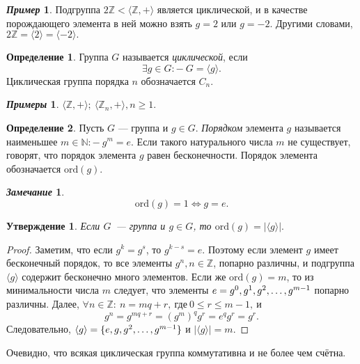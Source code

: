 \documentclass[a4paper, 14pt]{extarticle}
\newcommand{\integers}{\mathbb{Z}}
\newcommand{\naturals}{\mathbb{N}}
\newcommand{\ord}{\mathrm{ord}}
\newcommand{\suchthat}{{:}{-} \ }
\theoremstyle{definition}
\newtheorem*{exmpl*}{\textit{Пример}}
\newtheorem*{exmpls}{\textit{Примеры}}
\newtheorem*{remark}{\textit{Замечание}}
\newtheorem{definition}{Определение}
\theoremstyle{plain}
\numberwithin{theorem}{section}
\numberwithin{definition}{section}
\newtheorem*{statement*}{Утверждение}
\numberwithin{statement}{section}
\numberwithin{lemma}{section}
\numberwithin{consequence}{section}
\begin{document}
	\begin{exmpl*}
		Подгруппа ${2\integers < \langle \integers, + \rangle}$ является циклической, и в качестве порождающего элемента в ней можно взять $g = 2$ или $g = -2.$ Другими словами, ${2\integers = \langle 2 \rangle = \langle -2 \rangle.}$
	\end{exmpl*}
	\begin{definition}
		Группа $G$ называется \textit{циклической}, если 
		\begin{equation*}
			\exists g \in G \suchthat G = \langle g \rangle.
		\end{equation*}
		Циклическая группа порядка $n$ обозначается ${C_n.}$
	\end{definition}
	\begin{exmpls}
		${\langle \integers, + \rangle; \ \langle \integers_n, + \rangle, n \geqslant 1.}$
	\end{exmpls}
	\begin{definition}
		Пусть $G$ — группа и ${g \in G}$. \textit{Порядком} элемента $g$ называется наименьшее ${m \in \naturals \suchthat g^m = e}$. Если такого натурального числа $m$ не существует, говорят, что порядок элемента $g$ равен бесконечности. Порядок элемента обозначается $\ord(g)$.
	\end{definition}
	\begin{remark}
		\begin{equation*}
			\ord(g) = 1 \Longleftrightarrow g = e.
		\end{equation*}
		
	\end{remark}
	\begin{statement*}
		Если $G$~--- группа и $g \in G$, то $\ord(g) = |\langle g \rangle|.$
	\end{statement*}
	\begin{proof}
		Заметим, что если $g^k = g^s$, то $g^{k - s} = e$. Поэтому если элемент $g$ имеет бесконечный порядок, то все элементы $g^n, n \in \integers$, попарно различны, и подгруппа $\langle g \rangle$ содержит бесконечно много элементов. 
		Если же ${\ord(g) = m}$, то из минимальности числа $m$ следует, что элементы ${e = g^0, g^1, g^2, \mathellipsis , g^{m-1}}$ попарно различны.
		Далее, ${\forall n \in \integers{:} \ n = mq + r, \ \text{где} \ 0 \leqslant r \leq m - 1, \ \text{и}}$
		\begin{equation*}
			g^n = g^{mq + r} = (g^m)^q g^r = e^q g^r = g^r.
		\end{equation*}
		Следовательно, $\langle g \rangle = \{e, g, g^2, \mathellipsis, g^{m - 1}\}$ и $|\langle g \rangle| = m.$
	\end{proof}
	Очевидно, что всякая циклическая группа коммутативна и не более чем счётна.
	\newpage
\end{document}
